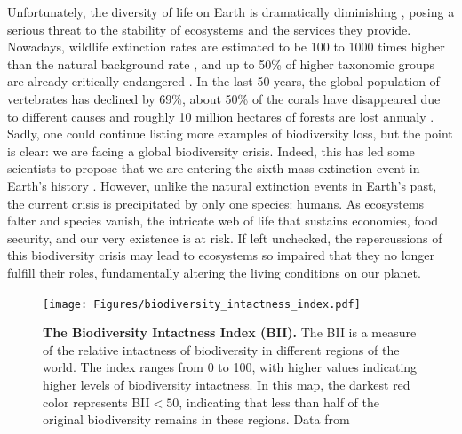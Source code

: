 Unfortunately, the diversity of life on Earth is dramatically diminishing
\cite{Hughes1997,Ceballos2002,Pereira2010}, posing a serious threat to the
stability of ecosystems and the services they provide. Nowadays, wildlife
extinction rates are estimated to be 100 to 1000 times higher than the natural
background rate \cite{Ceballos2015,Pimm2014}, and up to 50\% of higher
taxonomic groups are already critically endangered \cite{Smith2009}. In the
last 50 years, the global population of vertebrates has declined by 69\%, about
50\% of the corals have disappeared due to different causes and roughly 10
million hectares of forests are lost annualy \cite{WWF2022}. Sadly, one could
continue listing more examples of biodiversity loss, but the point is clear: we
are facing a global biodiversity crisis. Indeed, this has led some scientists
to propose that we are entering the sixth mass extinction event in Earth's
history \cite{Barnosky2011}. However, unlike the natural extinction events in
Earth’s past, the current crisis is precipitated by only one species: humans.
As ecosystems falter and species vanish, the intricate web of life that
sustains economies, food security, and our very existence is at risk. If left
unchecked, the repercussions of this biodiversity crisis may lead to ecosystems
so impaired that they no longer fulfill their roles, fundamentally altering the
living conditions on our planet.

\begin{figure}[H]
  \centering
  \texttt{[image: Figures/biodiversity\_intactness\_index.pdf]}
  \caption[The Biodiversity Intactness
    Index]{\label{fig:biodiversity_intactness_index} \textbf{The Biodiversity
      Intactness Index (BII).} The BII is a measure of the relative intactness
    of biodiversity in	different regions of the world. The index ranges from 0
    to 100, with higher values indicating higher levels of biodiversity
    intactness. In this map, the darkest red color represents BII$<50$,
    indicating that less than half of the original biodiversity remains in
    these regions. Data from \cite{Newbold2016}}
\end{figure}

